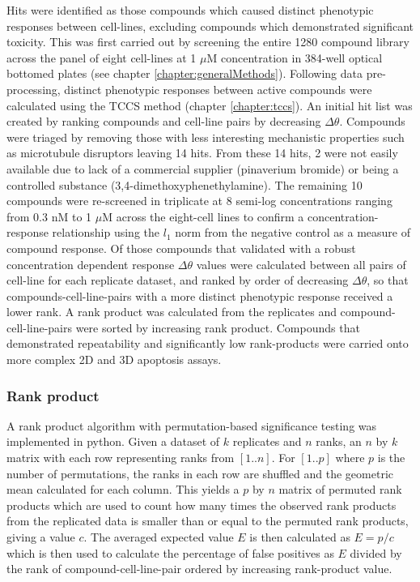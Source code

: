 \documentclass[a4paper,11pt,twoside,openright]{scrbook}
\begin{document}
Hits were identified as those compounds which caused distinct phenotypic responses between cell-lines, excluding 
compounds which demonstrated significant toxicity.
This was first carried out by screening the entire 1280 compound library across the panel of eight cell-lines at 1 
$\mu$M concentration in 384-well optical bottomed plates (see chapter \ref{chapter:generalMethods}).
Following data pre-processing, distinct phenotypic responses between active compounds were calculated using the TCCS 
method (chapter \ref{chapter:tccs}).
An initial hit list was created by ranking compounds and cell-line pairs by decreasing $\Delta\theta$.
Compounds were triaged by removing those with less interesting mechanistic properties such as microtubule disruptors 
leaving 14 hits.
From these 14 hits, 2 were not easily available due to lack of a commercial supplier (pinaverium bromide) or being a 
controlled substance (3,4-dimethoxyphenethylamine).
The remaining 10 compounds were re-screened in triplicate at 8 semi-log concentrations ranging from 0.3 nM to 1 $\mu$M 
across the eight-cell lines to confirm a concentration-response relationship using the $l_1$ norm from the negative 
control as a measure of compound response.
Of those compounds that validated with a robust concentration dependent response $\Delta\theta$ values were calculated 
between all pairs of cell-line for each replicate dataset, and ranked by order of decreasing $\Delta\theta$, so that 
compounds-cell-line-pairs with a more distinct phenotypic response received a lower rank.
A rank product \cite{Breitling2004} was calculated from the replicates and compound-cell-line-pairs were sorted by 
increasing rank product.
Compounds that demonstrated repeatability and significantly low rank-products were carried onto more complex 2D and 3D 
apoptosis assays.


\subsubsection{Rank product}

A rank product algorithm with permutation-based significance testing was implemented in python.
Given a dataset of $k$ replicates and $n$ ranks, an $n$ by $k$ matrix with each row representing ranks from $[1..n]$.
For $[1..p]$ where $p$ is the number of permutations, the ranks in each row are shuffled and the geometric mean 
calculated for each column.
This yields a $p$ by $n$ matrix of permuted rank products which are used to count how many times the observed rank 
products from the replicated data is smaller than or equal to the permuted rank products, giving a value $c$.
The averaged expected value $E$ is then calculated as $E = p / c$ which is then used to calculate the percentage of 
false positives as $E$ divided by the rank of compound-cell-line-pair ordered by increasing rank-product value.
\end{document}
